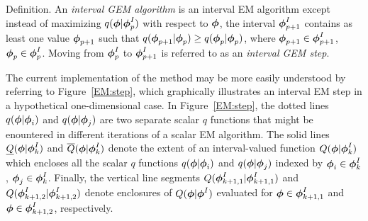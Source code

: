 Definition.   An {\it interval GEM algorithm}
is an interval EM algorithm except instead
of maximizing $q(\bfphi|\bfphi^I_p)$ with respect to $\bfphi$, the interval 
$\bfphi^I_{p+1}$ contains
as least one value $\bfphi_{p+1}$ such that 
$q(\bfphi_{p+1} | \bfphi_p ) \geq q(\bfphi_p |\bfphi_p )$,
where $\bfphi_{p+1} \in \bfphi^I_{p+1}$,
$\bfphi_p \in \bfphi^I_p$.  Moving from $\bfphi_p^I$ to $\bfphi_{p+1}^I$ 
is referred to
as an {\it interval GEM step}.

The current 
implementation of the method may be more easily understood by referring to
Figure~\ref{EM:step}, which graphically illustrates an interval EM step in a 
hypothetical one-dimensional case. 
In Figure~\ref{EM:step}, the dotted lines
$q(\bfphi|\bfphi_i)$ and $q(\bfphi|\bfphi_j)$ are
two separate scalar $q$ functions that might be enountered in different
iterations of a scalar EM algorithm.  The solid lines 
$\protect\underline{Q}(\bfphi|\bfphi^I_k)$ and 
$\protect\overline{Q}(\bfphi|\bfphi^I_k)$ denote the extent of 
an interval-valued function $Q(\bfphi|\bfphi^I_k)$ 
which encloses all the scalar
$q$ functions $q(\bfphi|\bfphi_i)$ and $q(\bfphi|\bfphi_j)$ 
indexed by $\bfphi_i \in \bfphi^I_k$, $\bfphi_j \in \bfphi^I_k$.
Finally, the vertical line segments $Q(\bfphi_{k+1,1}^I|\bfphi_{k+1,1}^I)$ and 
$Q(\bfphi_{k+1,2}^I|\bfphi_{k+1,2}^I)$ 
denote enclosures of $Q(\bfphi|\bfphi^I)$ 
evaluated for $\bfphi \in \bfphi_{k+1,1}^I$ and $\bfphi \in \bfphi_{k+1,2}^I$,
respectively.


